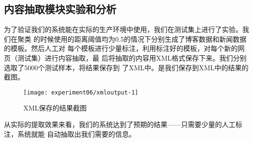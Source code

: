 \subsection{内容抽取模块实验和分析}
为了验证我们的系统能在实际的生产环境中使用，我们在测试集上进行了实验。我们在聚类
的时候使用的距离阈值均为0.5的情况下分别生成了博客数据和新闻数据的模板。然后人工对
每个模板进行少量标注，利用标注好的模板，对每个新的网页（测试集）进行内容抽取，最
后将抽取的内容用XML格式保存下来。我们分别选取了5000个测试样本，将结果保存到
了XML中。是我们保存到XML中的结果的截图。
\begin{figure}[hb]
  \centering
  \texttt{[image: experiment06/xmloutput-1]}
  \caption{XML保存的结果截图}
  \label{experiment:fig:xmloutput}
\end{figure}

从实际的提取效果来看，我们的系统达到了预期的结果——只需要少量的人工标注，系统就能
自动抽取出我们需要的信息。

